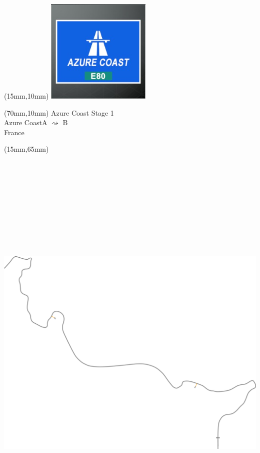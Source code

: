 \null\newpage
\begin{textblock*}{50mm}(15mm,10mm)%
\includegraphics[width=50mm]{LG/2015-05-20_00073.png}
\end{textblock*}
\begin{textblock*}{130mm}(70mm,10mm)%
{\fontsize{20}{20}\selectfont Azure Coast Stage 1\\}
{\fontsize{16}{16}\selectfont Azure Coast\hfill A $\rightsquigarrow$ B\\}
{\fontsize{12}{12}\selectfont France\\}
\end{textblock*}
\begin{textblock*}{185mm}(15mm,65mm)%
\centering
\mbox{\includegraphics[width=185mm,height=210mm,keepaspectratio]{PT/AZCOS1.pdf}}
\end{textblock*}
